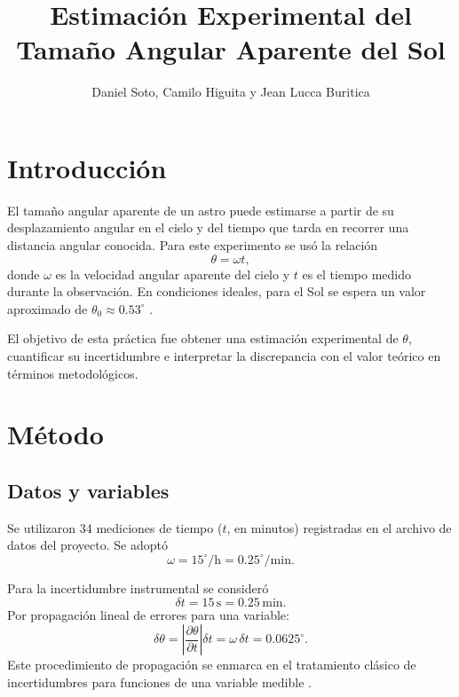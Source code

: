 \documentclass[stu,12pt,floatsintext]{apa7}
\title{Estimación Experimental del Tamaño Angular Aparente del Sol}
\author{Daniel Soto, Camilo Higuita y Jean Lucca Buritica}
\affiliation{Universidad de Antioquia}
\begin{document}
\maketitle

\section{Introducción}
El tamaño angular aparente de un astro puede estimarse a partir de su desplazamiento angular en el cielo y del tiempo que tarda en recorrer una distancia angular conocida. Para este experimento se usó la relación
\begin{equation}
\theta = \omega t,
\end{equation}
donde $\omega$ es la velocidad angular aparente del cielo y $t$ es el tiempo medido durante la observación. En condiciones ideales, para el Sol se espera un valor aproximado de $\theta_0\approx0.53^\circ$ \parencite{portilla2009elementos}.

El objetivo de esta práctica fue obtener una estimación experimental de $\theta$, cuantificar su incertidumbre e interpretar la discrepancia con el valor teórico en términos metodológicos.

\section{Método}
\subsection{Datos y variables}
Se utilizaron 34 mediciones de tiempo ($t$, en minutos) registradas en el archivo de datos del proyecto. Se adoptó
\begin{equation}
\omega = 15^\circ/\mathrm{h} = 0.25^\circ/\mathrm{min}.
\end{equation}

Para la incertidumbre instrumental se consideró
\begin{equation}
\delta t = 15\,\mathrm{s} = 0.25\,\mathrm{min}.
\end{equation}
Por propagación lineal de errores para una variable:
\begin{equation}
\delta\theta = \left|\frac{\partial \theta}{\partial t}\right|\delta t = \omega\,\delta t = 0.0625^\circ.
\end{equation}
Este procedimiento de propagación se enmarca en el tratamiento clásico de incertidumbres para funciones de una variable medible \parencite{baird1991experimentacion}.
\end{document}
